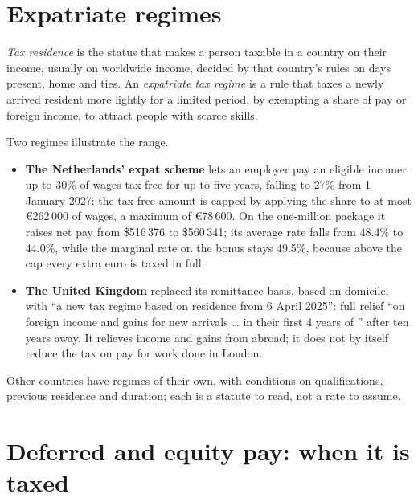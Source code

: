 \section{Expatriate regimes}

\begin{definition}\label{def:in:pay-regulation-and-tax-by-location:expat}
\emph{Tax residence} is the status that makes a person taxable in a country on their income,
usually on worldwide income, decided by that country's rules on days present, home and ties. An \emph{expatriate tax
regime} is a rule that taxes a newly arrived resident more lightly for a limited period,
by exempting a share of pay or foreign income, to attract people with scarce skills.
\end{definition}

Two regimes illustrate the range.
\begin{itemize}
\item \textbf{The Netherlands' expat scheme} lets an employer pay an eligible incomer up to 30\% of wages tax-free for up to
five years, falling to 27\% from 1 January 2027; the tax-free amount is capped by applying the share to at most
\euro262\,000 of wages, a maximum of \euro78\,600. On the one-million package it raises net pay from \$516\,376 to
\$560\,341; its average rate falls from 48.4\% to 44.0\%, while the marginal rate on the bonus stays 49.5\%, because above
the cap every extra euro is taxed in full.
\item \textbf{The United Kingdom} replaced its remittance basis, based on domicile, with ``a new tax regime based on
residence from 6 April 2025'': full relief ``on foreign income and gains for new arrivals \dots{} in their first 4 years of
'' after ten years away. It relieves income and gains from abroad; it does not by itself reduce the tax on
pay for work done in London.
\end{itemize}
Other countries have regimes of their own, with conditions on qualifications, previous residence and duration; each is
a statute to read, not a rate to assume.

\section{Deferred and equity pay: when it is taxed}

